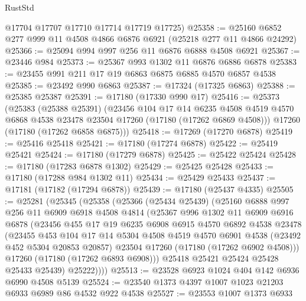 \begin{lexlean}{RustStd}
\begin{coremodule}
      @17704
      @17707
      @17710
      @17714
      @17719
      @17725)
@25358 := @25160 @6852 @277 @999 @11 @4508 @4866 @6876 @6921 (@25218 @277 @11 @4866 @24292)
@25366 := @25094 @994 @997 @256 @11 @6876 @6888 @4508 @6921
@25367 := @23446 @984
@25373 := @25367 @993 @1302 @11 @6876 @6886 @6878
@25383 := @23455 @991 @211 @17 @19 @6863 @6875 @6885 @4570 @6857 @4538
@25385 := @23492 @990 @6863
@25387 := @17324 (@17325 @6863)
@25388 := @25385 @25387
@25391 := @17180 (@17330 @990 @17)
@25416 := @25373
    (@25383
      (@25388 @25391)
      (@23456
        @104
        @17
        @14
        @6235
        @4508
        @4519
        @4570
        @6868
        @4538
        @23478
        @23504
        @17260
        (@17180 (@17262 @6869 @4508)))
      @17260
      (@17180 (@17262 @6858 @6875)))
@25418 := @17269 (@17270 @6878)
@25419 := @25416 @25418
@25421 := @17180 (@17274 @6878)
@25422 := @25419 @25421
@25424 := @17180 (@17279 @6878)
@25425 := @25422 @25424
@25428 := @17180 (@17283 @6878 @1302)
@25429 := @25425 @25428
@25433 := @17180 (@17288 @984 @1302 @11)
@25434 := @25429 @25433
@25437 := @17181 (@17182 (@17294 @6878))
@25439 := @17180 (@25437 @4335)
@25505 := @25281
    (@25345
      (@25358
        (@25366
          (@25434 @25439)
          (@25160
            @6888
            @997
            @256
            @11
            @6909
            @6918
            @4508
            @4814
            (@25367
              @996
              @1302
              @11
              @6909
              @6916
              @6878
              (@23456
                @455
                @17
                @19
                @6235
                @6908
                @6915
                @4570
                @6892
                @4538
                @23478
                (@23455
                  @453
                  @104
                  @17
                  @14
                  @5304
                  @4508
                  @4519
                  @4570
                  @6901
                  @4538
                  (@23492 @452 @5304 @20853 @20857)
                  @23504
                  @17260
                  (@17180 (@17262 @6902 @4508)))
                @17260
                (@17180 (@17262 @6893 @6908)))
              @25418
              @25421
              @25424
              @25428
              @25433
              @25439)
            @25222))))
@25513 := @23528 @6923 @1024 @404 @142 @6936 @6990 @4508 @5139
@25524 := @23540 @1373 @4397 @1007 @1023 @21203 @6933 @6989 @86 @4532 @922 @4538
@25527 := @23553 @1007 @1373 @6933

\end{coremodule}
\end{lexlean}
